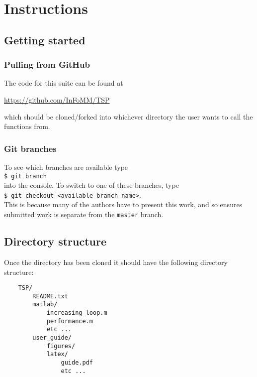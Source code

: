 \section{Instructions}
\label{sec:intructions}


\subsection{Getting started}
\label{subsec:getting_started}

\subsubsection{Pulling from GitHub}
\label{subsubsec:pulling_from_github}

The code for this suite can be found at 
\begin{center}
\href{https://github.com/InFoMM/TSP}{https://github.com/InFoMM/TSP}
\end{center}
which should be cloned/forked into whichever directory the user wants to call the functions from.

\subsubsection{Git branches}
\label{subsubsec:git_branches}

To see which branches are available type \\
\indent
\verb|$ git branch| \\
into the console. To switch to one of these branches, type \\
\indent
\verb|$ git checkout <available branch name>|. \\
This is because many of the authors have to present this work, and so ensures submitted work is separate from the \texttt{master} branch.

\subsection{Directory structure}
\label{subsec:directory_structure}

Once the directory has been cloned it should have the following directory structure:
\\
\noindent
\begin{minipage}{\linewidth}
\begin{verbatim}
    TSP/
        README.txt
        matlab/
            increasing_loop.m
            performance.m
            etc ...
        user_guide/
            figures/
            latex/
                guide.pdf
                etc ...
\end{verbatim}
\end{minipage}
\\
\noindent

